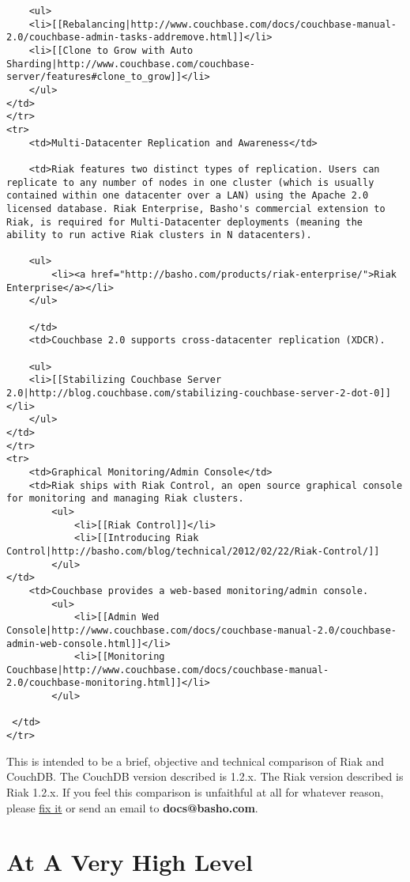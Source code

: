 \documentclass[letter]{book}
\newcounter{tab}[chapter]
\begin{document}
\begin{shaded}
\begin{verbatim}
    <ul>
    <li>[[Rebalancing|http://www.couchbase.com/docs/couchbase-manual-2.0/couchbase-admin-tasks-addremove.html]]</li>
    <li>[[Clone to Grow with Auto Sharding|http://www.couchbase.com/couchbase-server/features#clone_to_grow]]</li>
    </ul>
</td>
</tr>
<tr>
    <td>Multi-Datacenter Replication and Awareness</td>

    <td>Riak features two distinct types of replication. Users can replicate to any number of nodes in one cluster (which is usually contained within one datacenter over a LAN) using the Apache 2.0 licensed database. Riak Enterprise, Basho's commercial extension to Riak, is required for Multi-Datacenter deployments (meaning the ability to run active Riak clusters in N datacenters).

    <ul>
        <li><a href="http://basho.com/products/riak-enterprise/">Riak Enterprise</a></li>
    </ul>

    </td>
    <td>Couchbase 2.0 supports cross-datacenter replication (XDCR).

    <ul>
    <li>[[Stabilizing Couchbase Server 2.0|http://blog.couchbase.com/stabilizing-couchbase-server-2-dot-0]]</li>
    </ul>
</td>
</tr>
<tr>
    <td>Graphical Monitoring/Admin Console</td>
    <td>Riak ships with Riak Control, an open source graphical console for monitoring and managing Riak clusters.
        <ul>
            <li>[[Riak Control]]</li>
            <li>[[Introducing Riak Control|http://basho.com/blog/technical/2012/02/22/Riak-Control/]]
        </ul>
</td>
    <td>Couchbase provides a web-based monitoring/admin console.
        <ul>
            <li>[[Admin Wed Console|http://www.couchbase.com/docs/couchbase-manual-2.0/couchbase-admin-web-console.html]]</li>
            <li>[[Monitoring Couchbase|http://www.couchbase.com/docs/couchbase-manual-2.0/couchbase-monitoring.html]]</li>
        </ul>

 </td>
</tr>
\end{verbatim}\end{shaded}

This is intended to be a brief, objective and technical comparison of Riak and CouchDB. The CouchDB version described is 1.2.x. The Riak version described is Riak 1.2.x. If you feel this comparison is unfaithful at all for whatever reason, please \href{https://github.com/basho/basho_docs/issues/new}{fix it} or send an email to \textbf{docs@basho.com}.

\section{At A Very High Level}\label{at-a-very-high-level-2}
\end{document}
